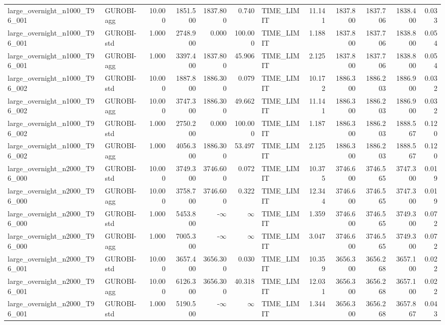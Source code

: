 \begin{table}[htbp]
\begin{tabular}{llrrrrlrrrrr}
large\_overnight\_n1000\_T96\_001 & GUROBI-agg & 10.000 & 1851.500 & 1837.800 & 0.740 & TIME\_LIMIT & 11.141 & 1837.800 & 1837.706 & 1838.400 & 0.033 \\
large\_overnight\_n1000\_T96\_001 & GUROBI-std & 1.000 & 2748.900 & 0.000 & 100.000 & TIME\_LIMIT & 1.188 & 1837.800 & 1837.706 & 1838.800 & 0.054 \\
large\_overnight\_n1000\_T96\_001 & GUROBI-agg & 1.000 & 3397.400 & 1837.800 & 45.906 & TIME\_LIMIT & 2.125 & 1837.800 & 1837.706 & 1838.800 & 0.054 \\
large\_overnight\_n1000\_T96\_002 & GUROBI-std & 10.000 & 1887.800 & 1886.300 & 0.079 & TIME\_LIMIT & 10.172 & 1886.300 & 1886.203 & 1886.900 & 0.032 \\
large\_overnight\_n1000\_T96\_002 & GUROBI-agg & 10.000 & 3747.300 & 1886.300 & 49.662 & TIME\_LIMIT & 11.141 & 1886.300 & 1886.203 & 1886.900 & 0.032 \\
large\_overnight\_n1000\_T96\_002 & GUROBI-std & 1.000 & 2750.200 & 0.000 & 100.000 & TIME\_LIMIT & 1.187 & 1886.300 & 1886.203 & 1888.567 & 0.120 \\
large\_overnight\_n1000\_T96\_002 & GUROBI-agg & 1.000 & 4056.300 & 1886.300 & 53.497 & TIME\_LIMIT & 2.125 & 1886.300 & 1886.203 & 1888.567 & 0.120 \\
large\_overnight\_n2000\_T96\_000 & GUROBI-std & 10.000 & 3749.300 & 3746.600 & 0.072 & TIME\_LIMIT & 10.375 & 3746.600 & 3746.565 & 3747.300 & 0.019 \\
large\_overnight\_n2000\_T96\_000 & GUROBI-agg & 10.000 & 3758.700 & 3746.600 & 0.322 & TIME\_LIMIT & 12.344 & 3746.600 & 3746.565 & 3747.300 & 0.019 \\
large\_overnight\_n2000\_T96\_000 & GUROBI-std & 1.000 & 5453.800 & -$\infty$ & $\infty$ & TIME\_LIMIT & 1.359 & 3746.600 & 3746.565 & 3749.300 & 0.072 \\
large\_overnight\_n2000\_T96\_000 & GUROBI-agg & 1.000 & 7005.300 & -$\infty$ & $\infty$ & TIME\_LIMIT & 3.047 & 3746.600 & 3746.565 & 3749.300 & 0.072 \\
large\_overnight\_n2000\_T96\_001 & GUROBI-std & 10.000 & 3657.400 & 3656.300 & 0.030 & TIME\_LIMIT & 10.359 & 3656.300 & 3656.268 & 3657.100 & 0.022 \\
large\_overnight\_n2000\_T96\_001 & GUROBI-agg & 10.000 & 6126.300 & 3656.300 & 40.318 & TIME\_LIMIT & 12.031 & 3656.300 & 3656.268 & 3657.100 & 0.022 \\
large\_overnight\_n2000\_T96\_001 & GUROBI-std & 1.000 & 5190.500 & -$\infty$ & $\infty$ & TIME\_LIMIT & 1.344 & 3656.300 & 3656.268 & 3657.867 & 0.043 \\

\end{tabular}
\end{table}
